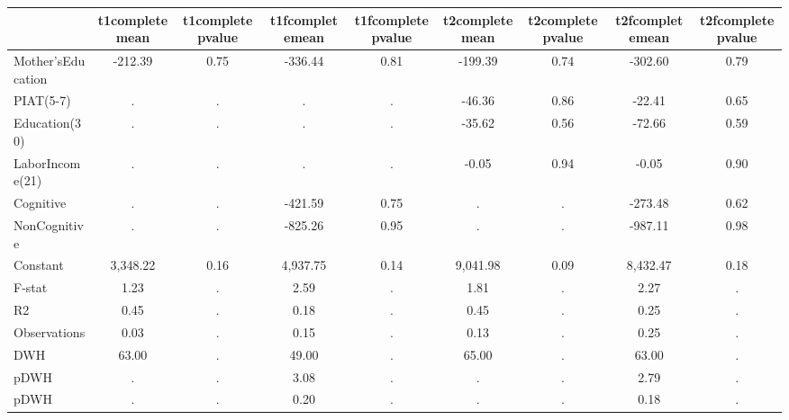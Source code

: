 \begin{table}[htbp]
\begin{tabular}{lcccccccc} \hline \hline
 & t1completemean  & t1completepvalue  & t1fcompletemean  & t1fcompletepvalue  & t2completemean  & t2completepvalue  & t2fcompletemean  & t2fcompletepvalue  \\  \hline 
Mother'sEducation &      -212.39 &         0.75 &      -336.44 &         0.81 &      -199.39 &         0.74 &      -302.60 &         0.79 \\  
PIAT(5-7) &            . &            . &            . &            . &       -46.36 &         0.86 &       -22.41 &         0.65 \\  
Education(30) &            . &            . &            . &            . &       -35.62 &         0.56 &       -72.66 &         0.59 \\  
LaborIncome(21) &            . &            . &            . &            . &        -0.05 &         0.94 &        -0.05 &         0.90 \\  
Cognitive &            . &            . &      -421.59 &         0.75 &            . &            . &      -273.48 &         0.62 \\  
NonCognitive &            . &            . &      -825.26 &         0.95 &            . &            . &      -987.11 &         0.98 \\  
Constant &     3,348.22 &         0.16 &     4,937.75 &         0.14 &     9,041.98 &         0.09 &     8,432.47 &         0.18 \\  
F-stat &         1.23 &            . &         2.59 &            . &         1.81 &            . &         2.27 &            . \\  
R2 &         0.45 &            . &         0.18 &            . &         0.45 &            . &         0.25 &            . \\  
Observations &         0.03 &            . &         0.15 &            . &         0.13 &            . &         0.25 &            . \\  
DWH &        63.00 &            . &        49.00 &            . &        65.00 &            . &        63.00 &            . \\  
pDWH &            . &            . &         3.08 &            . &            . &            . &         2.79 &            . \\  
pDWH &            . &            . &         0.20 &            . &            . &            . &         0.18 &            . \\  
\hline \hline \end{tabular}
\end{table}

